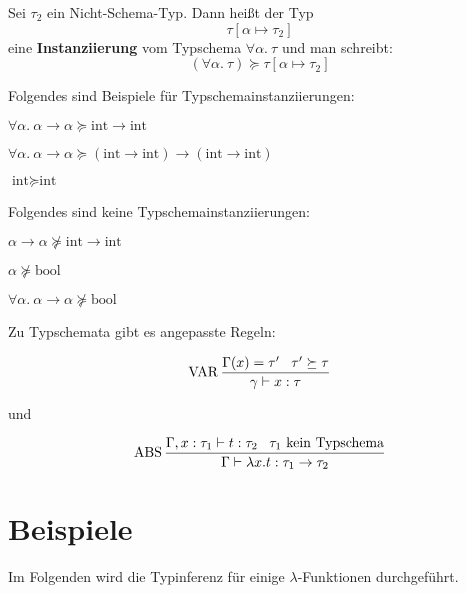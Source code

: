 \begin{definition}[Typschemainstanziierung]%
    Sei $\tau_2$ ein Nicht-Schema-Typ. Dann heißt der Typ
    \[\tau[\alpha \mapsto \tau_2]\]
    eine \textbf{Instanziierung} vom Typschema $\forall \alpha.\ \tau$
    und man schreibt:
    \[(\forall \alpha.\ \tau) \succeq \tau [\alpha \mapsto \tau_2]\]
\end{definition}

\begin{beispiel}[Typschemainstanziierung]
    Folgendes sind Beispiele für Typschemainstanziierungen:
    \begin{bspenum}
        \item $\forall \alpha.\ \alpha \rightarrow \alpha \succeq \text{int} \rightarrow \text{int}$
        \item $\forall \alpha.\ \alpha \rightarrow \alpha \succeq (\text{int} \rightarrow \text{int}) \rightarrow (\text{int} \rightarrow \text{int})$
        \item $\text{int} \succeq \text{int}$
    \end{bspenum}

    Folgendes sind keine Typschemainstanziierungen:
    \begin{bspenum}
        \item $\alpha \rightarrow \alpha \nsucceq \text{int} \rightarrow \text{int}$
        \item $\alpha \nsucceq \text{bool}$
        \item $\forall \alpha.\ \alpha \rightarrow \alpha \nsucceq \text{bool}$
    \end{bspenum}
\end{beispiel}

Zu Typschemata gibt es angepasste Regeln:%

\[\operatorname{VAR} \frac{\Gamma(x)= \tau' \;\;\; \tau' \succeq \tau}{\gamma \vdash x: \tau}\]

und

\[\operatorname{ABS} \frac{\Gamma, x: \tau_1 \vdash t: \tau_2 \;\;\; \tau_1 \text{ kein Typschema}}{\Gamma \vdash  \lambda x. t: \tau_1 \rightarrow \tau_2}\]


\section{Beispiele}
Im Folgenden wird die Typinferenz für einige $\lambda$-Funktionen durchgeführt.

